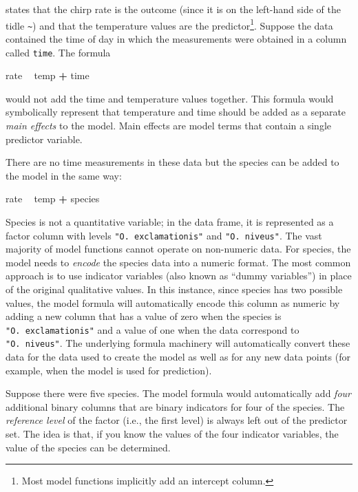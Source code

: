 \documentclass[11pt]{book}
\newenvironment{Shaded}{\begin{snugshade}}{\end{snugshade}}
\newcommand{\NormalTok}[1]{#1}
\newcommand{\OperatorTok}[1]{\textcolor[rgb]{0.81,0.36,0.00}{\textbf{#1}}}
\newcommand{\StringTok}[1]{\textcolor[rgb]{0.31,0.60,0.02}{#1}}
\let\rmarkdownfootnote\footnote%
\def\footnote{\protect\rmarkdownfootnote}
\begin{document}
states that the chirp rate is the outcome (since it is on the left-hand side of the tidle \texttt{\textasciitilde{}}) and that the temperature values are the predictor\footnote{Most model functions implicitly add an intercept column.}. Suppose the data contained the time of day in which the measurements were obtained in a column called \texttt{time}. The formula

\begin{Shaded}
\begin{Highlighting}[]
\NormalTok{rate }\OperatorTok{~}\StringTok{ }\NormalTok{temp }\OperatorTok{+}\StringTok{ }\NormalTok{time}
\end{Highlighting}
\end{Shaded}

would not add the time and temperature values together. This formula would symbolically represent that temperature and time should be added as a separate \emph{main effects} to the model. Main effects are model terms that contain a single predictor variable.

There are no time measurements in these data but the species can be added to the model in the same way:

\begin{Shaded}
\begin{Highlighting}[]
\NormalTok{rate }\OperatorTok{~}\StringTok{ }\NormalTok{temp }\OperatorTok{+}\StringTok{ }\NormalTok{species}
\end{Highlighting}
\end{Shaded}

Species is not a quantitative variable; in the data frame, it is represented as a factor column with levels \texttt{"O.\ exclamationis"} and \texttt{"O.\ niveus"}. The vast majority of model functions cannot operate on non-numeric data. For species, the model needs to \emph{encode} the species data into a numeric format. The most common approach is to use indicator variables (also known as ``dummy variables'') in place of the original qualitative values. In this instance, since species has two possible values, the model formula will automatically encode this column as numeric by adding a new column that has a value of zero when the species is \texttt{"O.\ exclamationis"} and a value of one when the data correspond to \texttt{"O.\ niveus"}. The underlying formula machinery will automatically convert these data for the data used to create the model as well as for any new data points (for example, when the model is used for prediction).

Suppose there were five species. The model formula would automatically add \emph{four} additional binary columns that are binary indicators for four of the species. The \emph{reference level} of the factor (i.e., the first level) is always left out of the predictor set. The idea is that, if you know the values of the four indicator variables, the value of the species can be determined.
\end{document}
